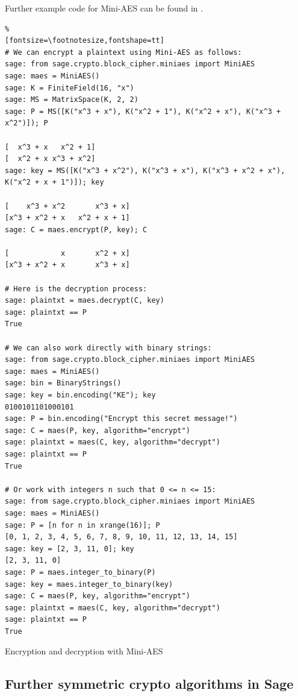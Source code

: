 Further example code for Mini-AES can be found in \cite[chap. 6.5 and appendix D]{cm:Nguyen2009}.

\begin{sagecode}
\begin{Verbatim}%
[fontsize=\footnotesize,fontshape=tt]
# We can encrypt a plaintext using Mini-AES as follows:
sage: from sage.crypto.block_cipher.miniaes import MiniAES
sage: maes = MiniAES()
sage: K = FiniteField(16, "x")
sage: MS = MatrixSpace(K, 2, 2)
sage: P = MS([K("x^3 + x"), K("x^2 + 1"), K("x^2 + x"), K("x^3 + x^2")]); P

[  x^3 + x   x^2 + 1]
[  x^2 + x x^3 + x^2]
sage: key = MS([K("x^3 + x^2"), K("x^3 + x"), K("x^3 + x^2 + x"), K("x^2 + x + 1")]); key

[    x^3 + x^2       x^3 + x]
[x^3 + x^2 + x   x^2 + x + 1]
sage: C = maes.encrypt(P, key); C

[            x       x^2 + x]
[x^3 + x^2 + x       x^3 + x]

# Here is the decryption process:
sage: plaintxt = maes.decrypt(C, key)
sage: plaintxt == P
True

# We can also work directly with binary strings:
sage: from sage.crypto.block_cipher.miniaes import MiniAES
sage: maes = MiniAES()
sage: bin = BinaryStrings()
sage: key = bin.encoding("KE"); key
0100101101000101
sage: P = bin.encoding("Encrypt this secret message!")
sage: C = maes(P, key, algorithm="encrypt")
sage: plaintxt = maes(C, key, algorithm="decrypt")
sage: plaintxt == P
True

# Or work with integers n such that 0 <= n <= 15:
sage: from sage.crypto.block_cipher.miniaes import MiniAES
sage: maes = MiniAES()
sage: P = [n for n in xrange(16)]; P
[0, 1, 2, 3, 4, 5, 6, 7, 8, 9, 10, 11, 12, 13, 14, 15]
sage: key = [2, 3, 11, 0]; key
[2, 3, 11, 0]
sage: P = maes.integer_to_binary(P)
sage: key = maes.integer_to_binary(key)
sage: C = maes(P, key, algorithm="encrypt")
sage: plaintxt = maes(C, key, algorithm="decrypt")
sage: plaintxt == P
True
\end{Verbatim}
\caption{Encryption and decryption with Mini-AES}
\end{sagecode}



\subsection{Further symmetric crypto algorithms in Sage}
\label{CM_Sage_SymCryptoAlg}

